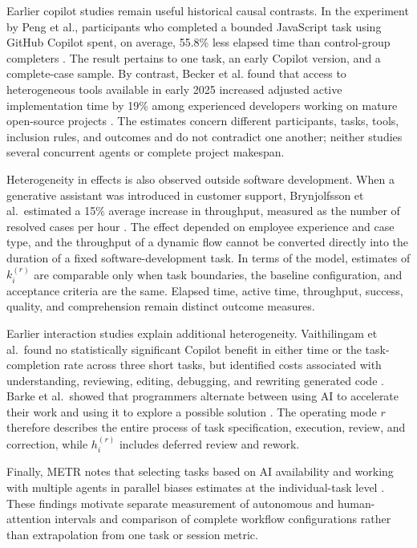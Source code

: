 Earlier copilot studies remain useful historical causal contrasts. In the
experiment by Peng et al., participants who completed a bounded JavaScript task
using GitHub Copilot spent, on average, 55.8\% less elapsed time than
control-group completers \cite{peng2023impact}. The result pertains to one task,
an early Copilot version, and a complete-case sample. By contrast, Becker et al.
found that access to heterogeneous tools available in early 2025 increased
adjusted active implementation time by 19\% among experienced developers working
on mature open-source projects \cite{becker2025measuring}. The estimates concern
different participants, tasks, tools, inclusion rules, and outcomes and do not
contradict one another; neither studies several concurrent agents or complete
project makespan.

Heterogeneity in effects is also observed outside software development. When a
generative assistant was introduced in customer support, Brynjolfsson et al.\
estimated a 15\% average increase in throughput, measured as the number of
resolved cases per hour \cite{brynjolfsson2025generative}. The effect depended
on employee experience and case type, and the throughput of a dynamic flow
cannot be converted directly into the duration of a fixed software-development
task. In terms of the model, estimates of $k_i^{(r)}$ are comparable only when
task boundaries, the baseline configuration, and acceptance criteria are the
same. Elapsed time, active time, throughput, success, quality, and comprehension
remain distinct outcome measures.

Earlier interaction studies explain additional heterogeneity. Vaithilingam et al.\
found no statistically significant Copilot benefit in either time or the
task-completion rate across three short tasks, but
identified costs associated with understanding, reviewing, editing, debugging,
and rewriting generated code \cite{vaithilingam2022expectation}. Barke et al.\
showed that programmers alternate between using AI to accelerate their work and
using it to explore a possible solution \cite{barke2023grounded}. The operating
mode $r$ therefore describes the entire process of task specification,
execution, review, and correction, while $h_i^{(r)}$ includes deferred review
and rework.

Finally, METR notes that selecting tasks based on AI availability and working
with multiple agents in parallel biases estimates at the individual-task level
\cite{metr2026uplift}. These findings motivate separate measurement of
autonomous and human-attention intervals and comparison of complete workflow
configurations rather than extrapolation from one task or session metric.

